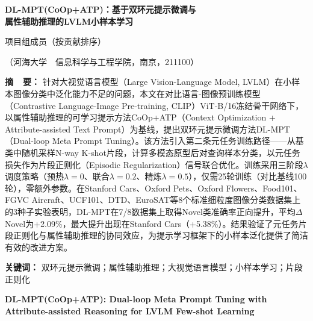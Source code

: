\documentclass[10pt,a4paper]{ctexart}
\newcommand{\papertitle}[1]{%
    \begin{center}
        {\heiti\zihao{3}\bfseries #1}
    \end{center}
}
\begin{document}
\thispagestyle{fancy}

\papertitle{DL-MPT(CoOp+ATP)：基于双环元提示微调与\\属性辅助推理的LVLM小样本学习}

\vspace{0.3cm}

\begin{center}
{\songti{} 项目组成员（按贡献排序）}
\end{center}

\begin{center}
{\songti{}
（河海大学\ \ 信息科学与工程学院，南京，211100）}
\end{center}

\vspace{0.4cm}

\noindent
{\fangsong{}\bfseries 摘\ \ 要：}
{\fangsong{}
针对大视觉语言模型（Large Vision-Language Model, LVLM）在小样本图像分类中泛化能力不足的问题，本文在对比语言-图像预训练模型（Contrastive Language-Image Pre-training, CLIP）ViT-B/16冻结骨干网络下，以属性辅助推理的可学习提示方法CoOp+ATP（Context Optimization + Attribute-assisted Text Prompt）为基线，提出双环元提示微调方法DL-MPT（Dual-loop Meta Prompt Tuning）。该方法引入第二条元任务训练路径——从基类中随机采样N-way K-shot片段，计算多模态原型后对查询样本分类，以元任务损失作为片段正则化（Episodic Regularization）信号联合优化。训练采用三阶段$\lambda$调度策略（预热$\lambda{=}0$、联合$\lambda{=}0.2$、精炼$\lambda{=}0.5$），仅需25轮训练（对比基线100轮），零额外参数。在Stanford Cars、Oxford Pets、Oxford Flowers、Food101、FGVC Aircraft、UCF101、DTD、EuroSAT等8个标准细粒度图像分类数据集上的3种子实验表明，DL-MPT在7/8数据集上取得Novel类准确率正向提升，平均$\Delta$Novel为+2.09\%，最大提升出现在Stanford Cars（+5.38\%）。结果验证了元任务片段正则化与属性辅助推理的协同效应，为提示学习框架下的小样本泛化提供了简洁有效的改进方案。
}

\vspace{0.2cm}

\noindent
{\fangsong{}\bfseries 关键词：}
{\fangsong{}
双环元提示微调；属性辅助推理；大视觉语言模型；小样本学习；片段正则化
}

\vspace{0.6cm}

\begin{center}
{\bfseries{} DL-MPT(CoOp+ATP): Dual-loop Meta Prompt Tuning with\\ Attribute-assisted Reasoning for LVLM Few-shot Learning}
\end{center}
\end{document}
